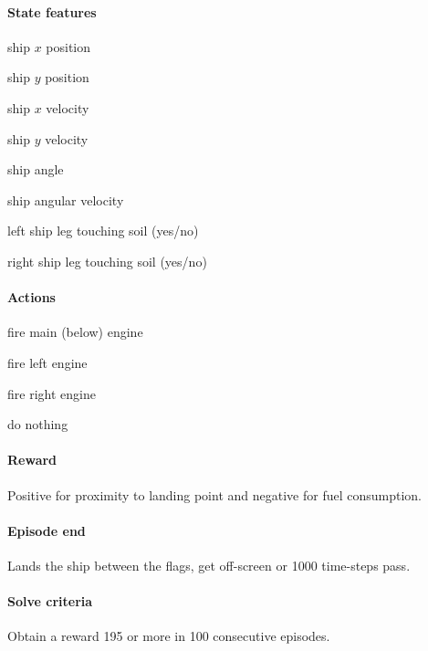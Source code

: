 \documentclass{article}
\begin{document}
\begin{multicols}{2}
\paragraph{State features}
\begin{compactitem}
  \item ship $x$ position
  \item ship $y$ position
  \item ship $x$ velocity
  \item ship $y$ velocity
  \item ship angle
  \item ship angular velocity
  \item left ship leg touching soil (yes/no)
  \item right ship leg touching soil (yes/no)
\end{compactitem}

\columnbreak

\paragraph{Actions}
\begin{compactitem}
  \item fire main (below) engine
  \item fire left engine
  \item fire right engine
  \item do nothing
\end{compactitem}

\end{multicols}

\paragraph{Reward} Positive for proximity to landing point and negative for fuel consumption.

\paragraph{Episode end}  Lands the ship between the flags, get off-screen or 1000 time-steps pass.

\paragraph{Solve criteria} Obtain a reward 195 or more in 100 consecutive episodes.
\end{document}
